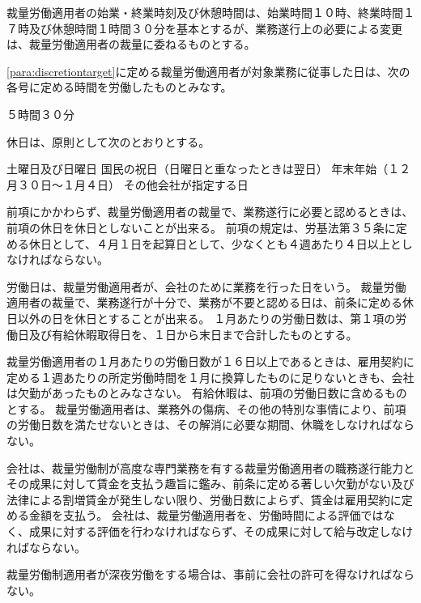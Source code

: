 \documentclass[10pt,a4paper,uplatex]{jsarticle}
\begin{document}
裁量労働適用者の始業・終業時刻及び休憩時間は、始業時間１０時、終業時間１７時及び休憩時間１時間３０分を基本とするが、業務遂行上の必要による変更は、裁量労働適用者の裁量に委ねるものとする。

\label{para:discretiontargetworktime}
\ref{para:discretiontarget}に定める裁量労働適用者が対象業務に従事した日は、次の各号に定める時間を労働したものとみなす。
\begin{enumerate}
    \itm ５時間３０分
\end{enumerate}

休日は、原則として次のとおりとする。
\begin{enumerate}
    \itm 土曜日及び日曜日
    \itm 国民の祝日（日曜日と重なったときは翌日）
    \itm 年末年始（１２月３０日〜１月４日）
    \itm その他会社が指定する日
\end{enumerate}
\term 前項にかかわらず、裁量労働適用者の裁量で、業務遂行に必要と認めるときは、前項の休日を休日としないことが出来る。
\term 前項の規定は、労基法第３５条に定める休日として、４月１日を起算日として、少なくとも４週あたり４日以上としなければならない。

労働日は、裁量労働適用者が、会社のために業務を行った日をいう。
\term 裁量労働適用者の裁量で、業務遂行が十分で、業務が不要と認める日は、前条に定める休日以外の日を休日とすることが出来る。
\term １月あたりの労働日数は、第１項の労働日及び有給休暇取得日を、１日から末日まで合計したものとする。

裁量労働適用者の１月あたりの労働日数が１６日以上であるときは、雇用契約に定める１週あたりの所定労働時間を１月に換算したものに足りないときも、会社は欠勤があったものとみなさない。
\term 有給休暇は、前項の労働日数に含めるものとする。
\term 裁量労働適用者は、業務外の傷病、その他の特別な事情により、前項の労働日数を満たせないときは、その解消に必要な期間、休職をしなければならない。

会社は、裁量労働制が高度な専門業務を有する裁量労働適用者の職務遂行能力とその成果に対して賃金を支払う趣旨に鑑み、前条に定める著しい欠勤がない及び法律による割増賃金が発生しない限り、労働日数によらず、賃金は雇用契約に定める金額を支払う。
\term 会社は、裁量労働適用者を、労働時間による評価ではなく、成果に対する評価を行わなければならず、その成果に対して給与改定しなければならない。

裁量労働制適用者が深夜労働をする場合は、事前に会社の許可を得なければならない。
\end{document}
